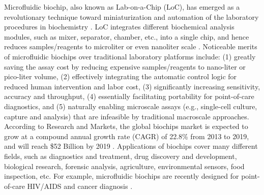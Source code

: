 \documentclass[journal]{IEEEtran}
\begin{document}
Microfluidic biochip, also known as Lab-on-a-Chip (LoC), has emerged as 
a revolutionary technique toward miniaturization and automation of the laboratory
procedures in biochemistry \cite{Balagadde:2005bk,Whitesides:2006jj,Yager:2006kd}. 
LoC integrates different biochemical analysis modules, such as mixer, separator, chamber, etc., 
into a single chip, and hence reduces samples/reagents to microliter or even nanoliter scale \cite{Thorsen:2002ec,Mark:2010fk}.
Noticeable merits of microfluidic biochips over traditional laboratory platforms include: (1) greatly saving the assay cost by reducing expensive samples/reagents to nano-liter or pico-liter volume, (2) effectively integrating the automatic control logic for reduced human intervention and labor cost, (3) significantly increasing sensitivity, accuracy and throughput, (4) essentially facilitating portability for point-of-care diagnostics, and (5) naturally enabling microscale assays (e.g., single-cell culture, capture and analysis) that are infeasible by traditional macroscale approaches.
According to Research and Markets, the global biochips market is expected to grow at a compound annual
growth rate (CAGR) of 22.8\% from 2013 to 2019, and will reach \$52 Billion by 2019 \cite{RandM}.
Applications of biochips cover many different fields, such as diagnostics and treatment, drug discovery and development, biological research, forensic analysis, agriculture, environmental sensors, food inspection, etc. For example, microfluidic biochips are recently designed for point-of-care HIV/AIDS and cancer diagnosis \cite{Watkins:2013id,rice}.
\end{document}
